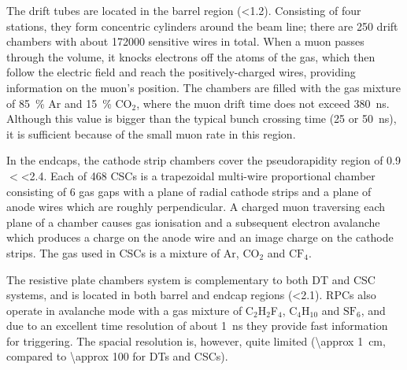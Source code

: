 The drift tubes are located in the barrel region (\abs\eta \num{<1.2}). Consisting of four stations, they form
concentric cylinders around the beam line; there are \num{250} drift chambers with about \num{172000} sensitive wires in
total. When a muon passes through the volume, it knocks electrons off the atoms of the gas, which then follow the
electric field and reach the positively-charged wires, providing information on the muon's position. The chambers are
filled with the gas mixture of \SI{85}{\percent} $\textrm{Ar}$ and \SI{15}{\percent} $\textrm{CO}_2$, where the muon
drift time does not exceed \SI{380}{\ns}. Although this value is bigger than the typical bunch crossing time (\num{25}
or \SI{50}{\ns}), it is sufficient because of the small muon rate in this region.

In the endcaps, the cathode strip chambers cover the pseudorapidity region of \num{0.9} $<$\abs\eta\num{<2.4}. Each of
\num{468} CSCs is a trapezoidal multi-wire proportional chamber consisting of 6 gas gaps with a plane of radial cathode
strips and a plane of anode wires which are roughly perpendicular. A charged muon traversing each plane of a chamber
causes gas ionisation and a subsequent electron avalanche which produces a charge on the anode wire and an image charge
on the cathode strips. The gas used in CSCs is a mixture of $\textrm{Ar}$, $\textrm{CO}_2$ and $\textrm{CF}_4$.

The resistive plate chambers system is complementary to both DT and CSC systems, and is located in both barrel and
endcap regions (\abs\eta\num{<2.1}). RPCs also operate in avalanche mode with a gas mixture of C$_2$H$_2$F$_4$,
C$_4$H$_{10}$ and $\textrm{SF}_6$, and due to an excellent time resolution of about \SI{1}{\ns} they provide fast
information for triggering. The spacial resolution is, however, quite limited (\SI{\approx 1}{\cm}, compared to
\SI{\approx 100}{\micron} for DTs and CSCs). %

